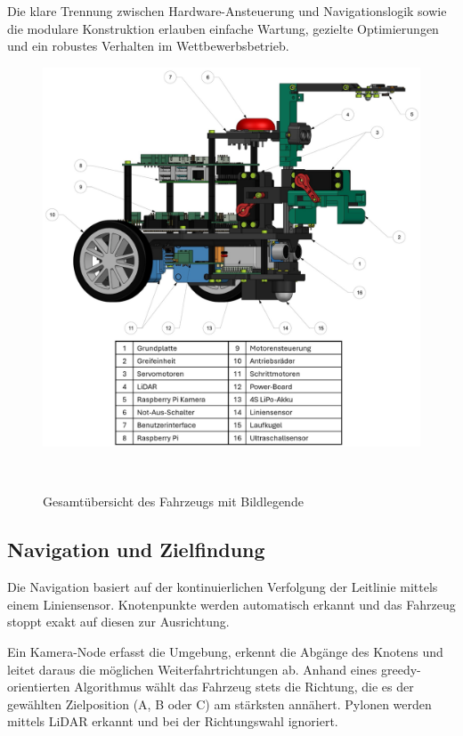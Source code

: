 \documentclass[main.tex]{subfiles} %
\begin{document}
Die klare Trennung zwischen Hardware-Ansteuerung und Navigationslogik sowie die modulare 
Konstruktion erlauben einfache Wartung, gezielte Optimierungen und ein robustes Verhalten 
im Wettbewerbsbetrieb.

\begin{figure}[H]
    \centering
    \includegraphics[width = 1.0\linewidth]{./Figures/Gesamtuebersicht_Fahrzeug_v2.png}
    \caption{Gesamtübersicht des Fahrzeugs mit Bildlegende}~\label{fig:Gesamtuebersicht}
\end{figure}

\vspace{1em}

\subsection{Navigation und Zielfindung}

Die Navigation basiert auf der kontinuierlichen Verfolgung der Leitlinie mittels einem 
Liniensensor. Knotenpunkte werden automatisch erkannt und das Fahrzeug stoppt exakt auf 
diesen zur Ausrichtung.

Ein Kamera-Node erfasst die Umgebung, erkennt die Abgänge des Knotens und leitet daraus 
die möglichen Weiterfahrtrichtungen ab. Anhand eines greedy-orientierten Algorithmus wählt 
das Fahrzeug stets die Richtung, die es der gewählten Zielposition (A, B oder C) am 
stärksten annähert. Pylonen werden mittels LiDAR erkannt und bei der Richtungswahl 
ignoriert.
\end{document}
